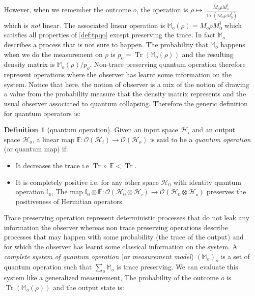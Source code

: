 \documentclass[10pt]{report}
\theoremstyle{plain}
\theoremstyle{definition}
\newtheorem{defn}{Definition}[chapter]
\theoremstyle{remark}
\DeclareMathOperator{\Tr}{Tr}
\begin{document}
However, when we remember the outcome $o$, the operation is $\rho \mapsto
\frac{M_o \rho M_o^\dagger}{\Tr(M_0\rho M_0^\dagger)}$ which is \emph{not}
linear. The associated linear operation is $\mathbb{M}_o(\rho) = M_o\rho
M_0^\dagger$ which satisfies all properties of \cref{def:tpqo} except preserving
the trace. In fact $\mathbb{M}_o$ describes a process that is not sure to
happen. The probability that $\mathbb{M}_o$ happens when we do the measurement
on $\rho$ is $p_o = \Tr(\mathbb{M}_o(\rho))$ and the resulting density matrix is
$\mathbb{M}_o(\rho)/p_o$.
Non-trace preserving quantum operation therefore represent
operations where the observer has learnt some information on the system. Notice
that here, the notion of observer is a mix of the notion of drawing a value from
the probability measure that the density matrix represents and the usual observer
associated to quantum collapsing. Therefore the generic definition for quantum
operators is:
\begin{defn}[quantum operation]\label{def:qo}
  Given an input space $\mathcal{H}_i$ and an output space $\mathcal{H}_o$, a
  linear map $\mathbb E : \mathcal{O}(\mathcal{H}_i) \to
  \mathcal{O}(\mathcal{H}_o)$ is said to be a \emph{quantum
    operation} (or quantum map) if:
  \begin{itemize}
  \item It decreases the trace i.e $\Tr \circ\; \mathbb E < \Tr$.
  \item It is completely positive i.e, for any other space $\mathcal{H}_0$ with
    identity quantum operation $\mathbb I_0$, The map $\mathbb I_0 \otimes
    \mathbb E : \mathcal{O}(\mathcal{H}_0 \otimes \mathcal{H}_i) \to
    \mathcal{O}(\mathcal{H}_0 \otimes \mathcal{H}_o)$ preserves the positiveness
    of Hermitian operators.
  \end{itemize}
\end{defn}

Trace preserving operation represent deterministic processes
that do not leak any information the observer whereas non trace preserving operations describe
processes that may happen with some probability (the trace of the output) and for which the
observer has learnt some classical information on the system. A \emph{complete system of
  quantum operation} (or \emph{measurement model}) ${(\mathbb{M}_o)}_o$ is a set of quantum
operation such that $\sum_o \mathbb M_o$ is trace preserving. We can evaluate
this system like a generalized measurement, The probability of the outcome $o$
is $\Tr(\mathbb M_o(\rho))$ and the output state is:
\end{document}
